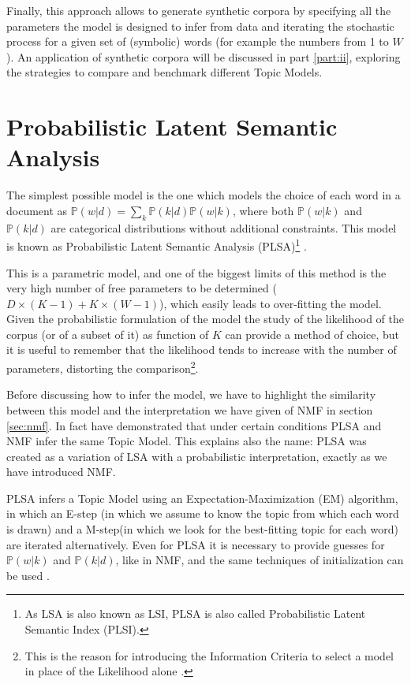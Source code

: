 \documentclass[11pt, a4paper, oneside, openright]{book}
\begin{document}
Finally, this approach allows to generate synthetic corpora by specifying all the parameters the model is designed to infer from data and iterating the stochastic process for a given set of (symbolic) words (for example the numbers from 1 to $W$).
An application of synthetic corpora will be discussed in part \ref{part:ii}, exploring the strategies to compare and benchmark different Topic Models.

\section{Probabilistic Latent Semantic Analysis}
\label{sec:plsa}
The simplest possible model is the one which models the choice of each word in a document as $\mathbb{P}(w|d) = \sum_k \mathbb{P}(k|d) \mathbb{P}(w|k)$, where both $\mathbb{P}(w|k)$ and $\mathbb{P}(k|d)$ are categorical distributions without additional constraints. This model is known as Probabilistic Latent Semantic Analysis (PLSA)\footnote{As LSA is also known as LSI, PLSA is also called Probabilistic Latent Semantic Index (PLSI).} \parencite{hofmann1999}.

This is a parametric model, and one of the biggest limits of this method is the very high number of free parameters to be determined ($D\times (K-1) + K \times (W-1)$), which easily leads to over-fitting the model. Given the probabilistic formulation of the model the study of the likelihood of the corpus (or of a subset of it) as function of $K$ can provide a method of choice, but it is useful to remember that the likelihood tends to increase with the number of parameters, distorting the comparison\footnote{This is the reason for introducing the Information Criteria to select a model in place of the Likelihood alone \parencite[e.g.][]{akaike1974}.}.

Before discussing how to infer the model, we have to highlight the similarity between this model and the interpretation we have given of NMF in section \ref{sec:nmf}. In fact \textcite{gaussier2005} have demonstrated that under certain conditions PLSA and NMF infer the same Topic Model. This explains also the name: PLSA was created as a variation of LSA with a probabilistic interpretation, exactly as we have introduced NMF.

PLSA infers a Topic Model using an Expectation-Maximization (EM) algorithm, in which an E-step (in which we assume to know the topic from which each word is drawn) and a M-step(in which we look for the best-fitting topic for each word) are iterated alternatively.
Even for PLSA it is necessary to provide guesses for $\mathbb{P}(w|k)$ and $\mathbb{P}(k|d)$, like in NMF, and the same techniques of initialization can be used \parencite[see for example][]{langville2014}.
\end{document}
